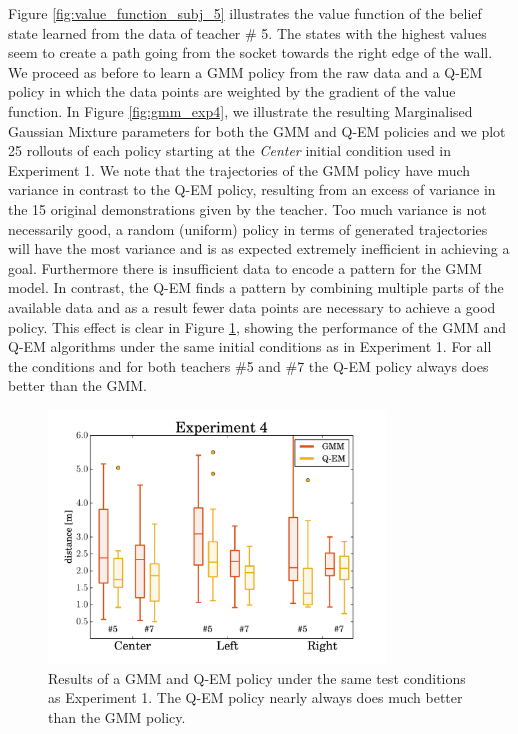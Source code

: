 \documentclass[final,3p,times,twocolumn]{elsarticle}
\begin{document}
Figure \ref{fig:value_function_subj_5} illustrates the value function of the belief state learned from the data of teacher \# 5.
The states with the highest values seem to create a path going from the socket towards the right edge of the wall. 
We proceed as before to learn a GMM policy from the raw data and a Q-EM policy in which the data points are weighted by 
the gradient of the value function. In Figure \ref{fig:gmm_exp4}, we illustrate the 
resulting Marginalised Gaussian Mixture parameters for both the GMM and Q-EM policies and we plot 25 rollouts of each policy starting at 
the \textit{Center} initial condition used in Experiment 1. We note that the trajectories of the GMM 
policy have much variance in contrast to the Q-EM policy, resulting from an excess of variance in the 15 original demonstrations
given by the teacher. Too much variance is not necessarily good, a random (uniform) policy in terms of generated trajectories
will have the most variance and is as expected extremely inefficient in achieving a goal. Furthermore there is insufficient data to encode a pattern for the GMM model. In contrast, the Q-EM finds a 
pattern by combining multiple parts of the available data and as a result fewer data points are necessary to achieve a good policy. 
This effect is clear in Figure \ref{fig:experiment4_stats}, showing the performance of the GMM and Q-EM algorithms 
under the same initial conditions as in Experiment 1. For all the conditions and for both teachers \#5 and \#7 the Q-EM policy 
always does better than the GMM.

\begin{figure}
 \centering
 \includegraphics[width=0.8\textwidth]{./Figures/Fig/experiment4.pdf}
 \caption{Results of a GMM and Q-EM policy under the same test conditions as Experiment 1. The Q-EM policy nearly always does much better than the GMM policy.}
 \label{fig:experiment4_stats}
\end{figure}
\end{document}
